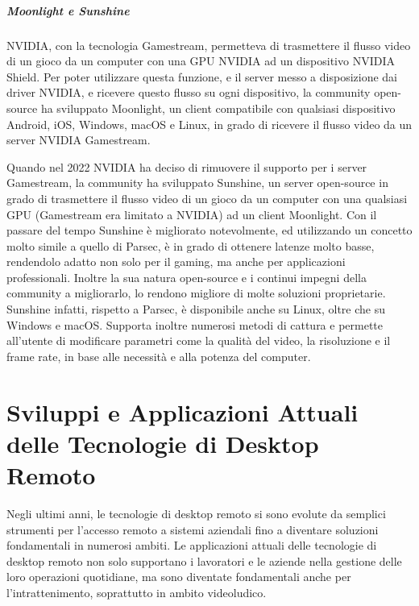 \documentclass[12pt,a4paper,openright,twoside]{book}
\begin{document}
\paragraph{Moonlight e Sunshine}
NVIDIA, con la tecnologia Gamestream, permetteva di trasmettere il flusso video di un gioco da un computer con una GPU NVIDIA ad un dispositivo NVIDIA Shield. Per poter utilizzare questa funzione, e il server messo a disposizione dai driver NVIDIA, e ricevere questo flusso su ogni dispositivo, la community open-source ha sviluppato Moonlight, un client compatibile con qualsiasi dispositivo Android, iOS, Windows, macOS e Linux, in grado di ricevere il flusso video da un server NVIDIA Gamestream.

Quando nel 2022 NVIDIA ha deciso di rimuovere il supporto per i server Gamestream, la community ha sviluppato Sunshine, un server open-source in grado di trasmettere il flusso video di un gioco da un computer con una qualsiasi GPU (Gamestream era limitato a NVIDIA) ad un client Moonlight.
Con il passare del tempo Sunshine è migliorato notevolmente, ed utilizzando un concetto molto simile a quello di Parsec, è in grado di ottenere latenze molto basse, rendendolo adatto non solo per il gaming, ma anche per applicazioni professionali. Inoltre la sua natura open-source e i continui impegni della community a migliorarlo, lo rendono migliore di molte soluzioni proprietarie. Sunshine infatti, rispetto a Parsec, è disponibile anche su Linux, oltre che su Windows e macOS. Supporta inoltre numerosi metodi di cattura e permette all'utente di modificare parametri come la qualità del video, la risoluzione e il frame rate, in base alle necessità e alla potenza del computer.

\chapter{Sviluppi e Applicazioni Attuali delle Tecnologie di Desktop Remoto}
\label{chap:current-applications}

Negli ultimi anni, le tecnologie di desktop remoto si sono evolute da semplici strumenti per l’accesso remoto a sistemi aziendali fino a diventare soluzioni fondamentali in numerosi ambiti. Le applicazioni attuali delle tecnologie di desktop remoto non solo supportano i lavoratori e le aziende nella gestione delle loro operazioni quotidiane, ma sono diventate fondamentali anche per l’intrattenimento, soprattutto in ambito videoludico.
\end{document}
